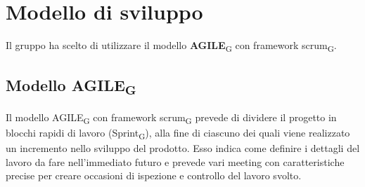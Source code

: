\section{Modello di sviluppo}
Il gruppo ha scelto di utilizzare il modello \textbf{AGILE}\textsubscript{G} con framework scrum\textsubscript{G}.

\subsection{Modello AGILE\textsubscript{G}}
Il modello AGILE\textsubscript{G} con framework scrum\textsubscript{G} prevede di dividere il progetto in blocchi rapidi di lavoro (Sprint\textsubscript{G}),
alla fine di ciascuno dei quali viene realizzato un incremento nello sviluppo del prodotto. 
Esso indica come definire i dettagli del lavoro da fare nell'immediato futuro e prevede 
vari meeting con caratteristiche precise per creare occasioni di ispezione e controllo del lavoro svolto.

